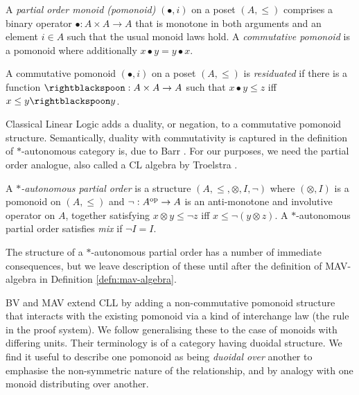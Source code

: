 \begin{definition}\label{defn:pomonoid}
  A \emph{partial order monoid (pomonoid)} $(\bullet, i)$ on a poset
  $(A, \leq)$ comprises a binary operator $\bullet : A \times A \to A$
  that is monotone in both arguments and an element $i \in A$ such
  that the usual monoid laws hold. A \emph{commutative pomonoid} is a
  pomonoid where additionally $x \bullet y = y \bullet x$.
\end{definition}

\begin{definition}\label{defn:residual}
  A commutative pomonoid $(\bullet, i)$ on a poset $(A, \leq)$ is
  \emph{residuated} if there is a function
  $\rightblackspoon : A \times A \to A$ such that $x \bullet y \leq z$
  iff $x \leq y \rightblackspoon y$.
\end{definition}

Classical Linear Logic adds a duality, or negation, to a commutative
pomonoid structure. Semantically, duality with commutativity is
captured in the definition of $*$-autonomous category is, due to Barr
\cite{Barr_1979}. For our purposes, we need the partial order
analogue, also called a CL algebra by Troelstra
\cite{Troelstra92:lll}.

\begin{definition}\label{defn:star-autonomous}
  A \emph{$*$-autonomous partial order} is a structure
  $(A, \leq, \otimes, I, \lnot)$ where $(\otimes, I)$ is a pomonoid on
  $(A, \leq)$ and $\lnot : A^{\mathrm{op}} \to A$ is an anti-monotone and
  involutive operator on $A$, together satisfying
  $x \otimes y \leq \lnot z$ iff $x \leq \lnot (y \otimes z)$.  A
  $*$-autonomous partial order satisfies \emph{mix} if $\lnot I = I$.
\end{definition}

\begin{remark}
  The structure of a $*$-autonomous partial order has a number of
  immediate consequences, but we leave description of these until
  after the definition of MAV-algebra in Definition
  \ref{defn:mav-algebra}.
\end{remark}

BV and MAV extend CLL by adding a non-commutative pomonoid structure
that interacts with the existing pomonoid via a kind of interchange
law (the  rule in the proof system). We follow
\cite{hopf-book} generalising these to the case of monoids with
differing units. Their terminology is of a category having duoidal
structure. We find it useful to describe one pomonoid as being
\emph{duoidal over} another to emphasise the non-symmetric nature of
the relationship, and by analogy with one monoid distributing over
another.

